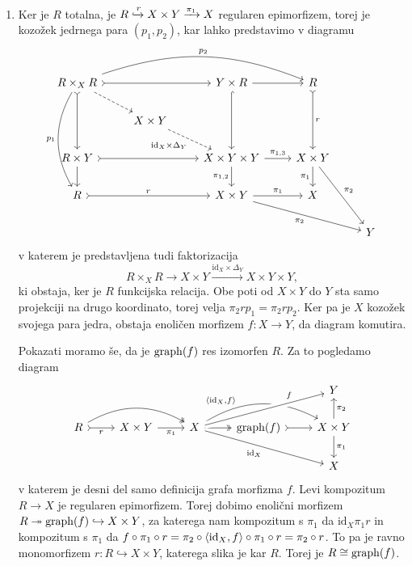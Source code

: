 \documentclass[../kategoricna_logika.tex]{subfiles}
\begin{document}
\begin{dokaz}
\begin{enumerate}[label=(\roman*)]
  \item Ker je $R$ totalna, je
    $R \xhookrightarrow{r} X \times Y \xrightarrow{\pi_1} X$ regularen
    epimorfizem, torej je kozožek jedrnega para $(p_1, p_2)$, kar
    lahko predstavimo v diagramu
    \begin{equation*}
      \begin{tikzcd}[column sep=normal]
        R \times_X R \ar[ddd, bend right=30, "p_1"'] \ar[dd, tail]
        \ar[dr, dashed] \ar[rr, tail]
        \ar[rrr, bend left=20, "p_2"] & &  Y \times R \ar[dd, hook] \ar[r] & R \ar[dd, tail, "r"] & \\
        & X \times Y \ar[dr, dashed, "\mathrm{id}_X \times \Delta_Y"'] & & & \\
        R \times Y \ar[d] \ar[rr, tail] & & X \times Y \times Y \ar[d,
        "\pi_{1,2}"']
        \ar[r, "\pi_{1,3}"] & X\times Y \ar[d, "\pi_1"'] \ar[ddr, "\pi_2"] & \\
        R \ar[rr, tail, "r"] & & X \times Y \ar[r, "\pi_1"] \ar[drr, "\pi_2"'] & X & \\
        & & & & Y
      \end{tikzcd}
    \end{equation*}
    v katerem je predstavljena tudi faktorizacija
    $$R \times_X R \to X \times Y \xrightarrow{\mathrm{id}_X \times \Delta_Y} X \times Y \times Y,$$
    ki obstaja, ker je $R$ funkcijska relacija.  Obe poti od
    $X \times Y$ do $Y$ sta samo projekciji na drugo koordinato, torej
    velja $\pi_2 r p_1 = \pi_2 r p_2$.  Ker pa je $X$ kozožek svojega
    para jedra, obstaja enoličen morfizem $f : X \to Y$, da diagram
    komutira.

    Pokazati moramo še, da je $\operatorname{graph}(f)$ res izomorfen $R$. Za to
    pogledamo diagram
    \begin{equation*}
      \begin{tikzcd}
        & & & & Y \\
        R \ar[r, tail, "r"'] \ar[rr, two heads, bend left] & X \times
        Y \ar[r, "\pi_1"'] & X \ar[r, two heads] \ar[rr, bend left,
        pos=0.3, "\fprod{\mathrm{id}_X, f}"] \ar[urr, crossing over,
        pos=0.75, "f"] \ar[drr, "\mathrm{id}_X"'] &
        \operatorname{graph}(f) \ar[r, tail] & X \times Y \ar[d, "\pi_1"] \ar[u, "\pi_2"'] \\
        & & & & X
      \end{tikzcd}
    \end{equation*}
    v katerem je desni del samo definicija grafa morfizma $f$.  Levi
    kompozitum $R \to X$ je regularen epimorfizem.  Torej dobimo
    enolični morfizem
    $R \twoheadrightarrow \operatorname{graph}(f) \hookrightarrow X \times Y$, za
    katerega nam kompozitum s $\pi_1$ da $\mathrm{id}_X \pi_1 r$ in
    kompozitum s $\pi_1$ da
    $f \circ \pi_1 \circ r = \pi_2 \circ \langle \mathrm{id}_X, f \rangle \circ \pi_1
    \circ r = \pi_2 \circ  r$.  To pa je ravno monomorfizem
    $r : R \hookrightarrow X \times Y$, katerega slika je kar $R$.
    Torej je $R \cong \operatorname{graph}(f)$.\qedhere
  \end{enumerate}
\end{dokaz}
\end{document}
